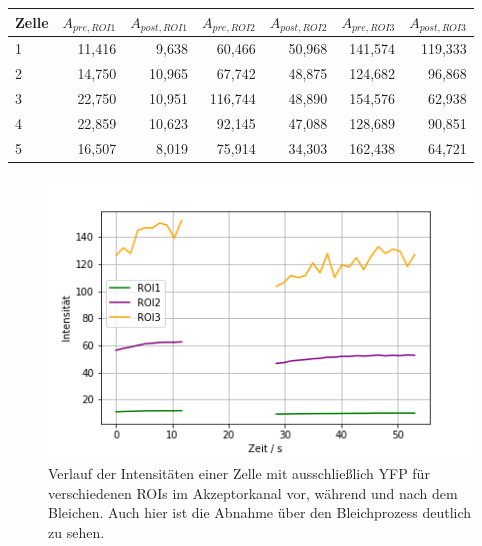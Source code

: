 \begin{center}
    \centering
    \begin{tabular}{lrrrrrr}
        \toprule
        Zelle &   $A_{pre,ROI1}$ &  $A_{post,ROI1}$ &   $A_{pre,ROI2}$ &  $A_{post,ROI2}$ &    $A_{pre,ROI3}$ &   $A_{post,ROI3}$ \\
        \midrule
        1 & 11,416 &  9,638 &  60,466 & 50,968 & 141,574 & 119,333 \\
        2 & 14,750 & 10,965 &  67,742 & 48,875 & 124,682 &  96,868 \\
        3 & 22,750 & 10,951 & 116,744 & 48,890 & 154,576 &  62,938 \\
        4 & 22,859 & 10,623 &  92,145 & 47,088 & 128,689 &  90,851 \\
        5 & 16,507 &  8,019 &  75,914 & 34,303 & 162,438 &  64,721 \\
        \bottomrule
    \end{tabular}
    \label{tab:bleachYFP}
\end{center}

\begin{figure}[h]
    \centering
    \includegraphics[scale = 0.65]{Bilder/bleachPlotYFP.png}
    \caption{Verlauf der Intensitäten einer Zelle mit ausschließlich YFP für verschiedenen ROIs im Akzeptorkanal vor, während und 
    nach dem Bleichen. Auch hier ist die Abnahme über den Bleichprozess deutlich zu sehen.}
    \label{bild:bleachCFPs}
\end{figure}

\clearpage